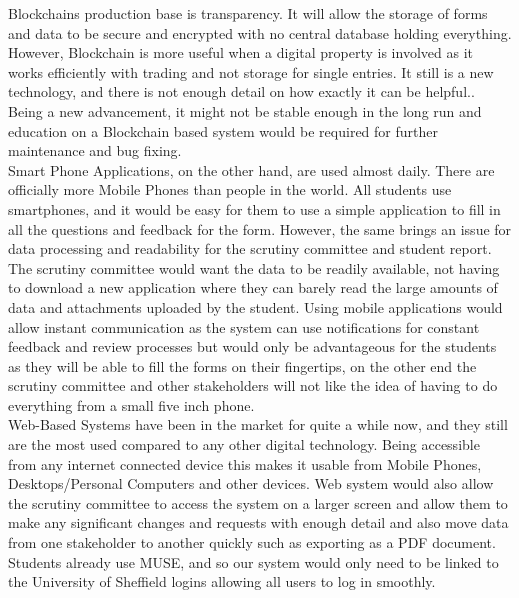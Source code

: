 \documentclass[../main.tex]{subfiles}
\begin{document}
\raggedright

Blockchains production base is transparency. It will allow the storage of forms and data to be secure and encrypted with no central database holding everything. However, Blockchain is more useful when a digital property is involved as it works efficiently with trading and not storage for single entries. It still is a new technology, and there is not enough detail on how exactly it can be helpful.\cite{vergeblockchain}. Being a new advancement, it might not be stable enough in the long run and education on a Blockchain based system would be required for further maintenance and bug fixing. \\[2mm]

Smart Phone Applications, on the other hand, are used almost daily. There are officially more Mobile Phones than people in the world\cite{morephones}. All students use smartphones, and it would be easy for them to use a simple application to fill in all the questions and feedback for the form. However, the same brings an issue for data processing and readability for the scrutiny committee and student report. The scrutiny committee would want the data to be readily available, not having to download a new application where they can barely read the large amounts of data and attachments uploaded by the student. Using mobile applications would allow instant communication as the system can use notifications for constant feedback and review processes but would only be advantageous for the students as they will be able to fill the forms on their fingertips, on the other end the scrutiny committee and other stakeholders will not like the idea of having to do everything from a small five inch phone. \\[2mm]

Web-Based Systems have been in the market for quite a while now, and they still are the most used compared to any other digital technology\cite{morewebsites}.
Being accessible from any internet connected device this makes it usable from Mobile Phones, Desktops/Personal Computers and other devices. Web system would also allow the scrutiny committee to access the system on a larger screen and allow them to make any significant changes and requests with enough detail and also move data from one stakeholder to another quickly such as exporting as a PDF document. Students already use MUSE\cite{muse}, and so our system would only need to be linked to the University of Sheffield logins allowing all users to log in smoothly. 
\end{document}
